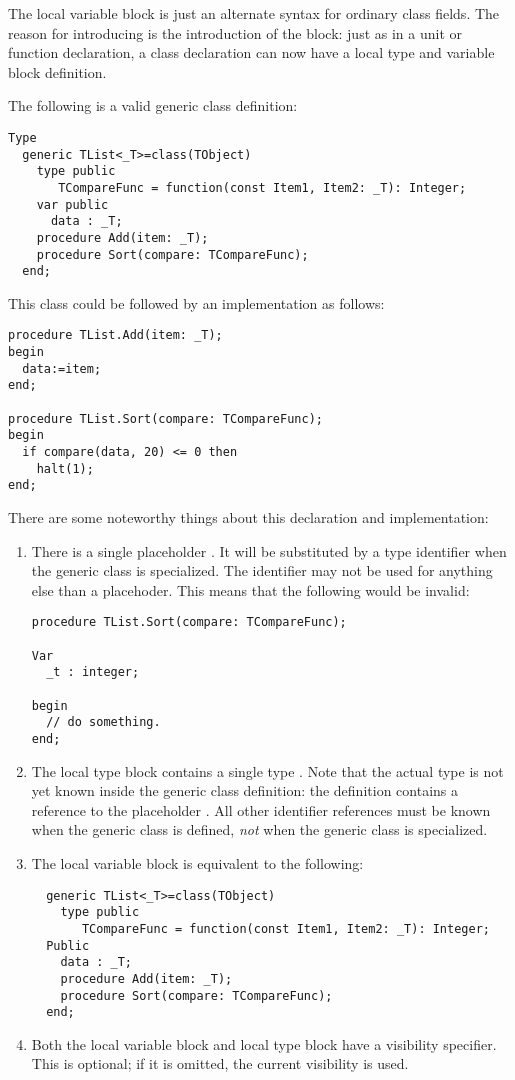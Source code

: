 The local variable block is just an alternate syntax for ordinary class fields.
The reason for introducing is the introduction of the  block: just
as in a unit or function declaration, a class declaration can now have a
local type and variable block definition.

The following is a valid generic class definition:
\begin{verbatim}
Type
  generic TList<_T>=class(TObject)
    type public
       TCompareFunc = function(const Item1, Item2: _T): Integer;
    var public
      data : _T;
    procedure Add(item: _T);
    procedure Sort(compare: TCompareFunc);
  end;
\end{verbatim}
This class could be followed by an implementation as follows:
\begin{verbatim}
procedure TList.Add(item: _T);
begin
  data:=item;
end;

procedure TList.Sort(compare: TCompareFunc);
begin
  if compare(data, 20) <= 0 then
    halt(1);
end;
\end{verbatim}
There are some noteworthy things about this declaration and implementation:
\begin{enumerate}
\item There is a single placeholder . It will be substituted by a
type identifier when the generic class is specialized. The identifier
 may not be used for anything else than a placehoder. This means
that the following would be invalid:
\begin{verbatim}
procedure TList.Sort(compare: TCompareFunc);

Var
  _t : integer;

begin
  // do something.
end;
\end{verbatim}
\item The local type block contains a single type . Note
that the actual type is not yet known inside the generic class definition:
the definition contains a reference to the placeholder . All other
identifier references must be known when the generic class is defined, {\em not}
when the generic class is specialized.
\item The local variable block is equivalent to the following:
\begin{verbatim}
  generic TList<_T>=class(TObject)
    type public
       TCompareFunc = function(const Item1, Item2: _T): Integer;
  Public  
    data : _T;
    procedure Add(item: _T);
    procedure Sort(compare: TCompareFunc);
  end;
\end{verbatim}
\item Both the local variable block and local type block have a visibility
specifier. This is optional; if it is omitted, the current visibility is
used.
\end{enumerate}

